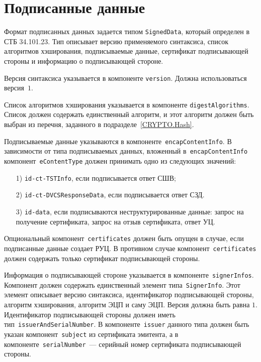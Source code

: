 \section{Подписанные данные}\label{FMT.SignedData}

Формат подписанных данных задается типом \texttt{SignedData}, 
который определен в СТБ 34.101.23. Тип описывает версию применяемого 
синтаксиса, список алгоритмов хэширования, подписываемые данные, 
сертификат подписывающей стороны и информацию о подписывающей стороне. 

Версия синтаксиса указывается в компоненте \texttt{version}.
Должна использоваться версия~$1$.

Список алгоритмов хэширования указывается в компоненте
\texttt{digestAlgorithms}. Список должен содержать единственный алгоритм,
и этот алгоритм должен быть выбран из перечня, 
заданного в подразделе~\ref{CRYPTO.Hash}.

Подписываемые данные указываются в компоненте~\texttt{encapContentInfo}. 
%
В зависимости от типа подписываемых данных, вложенный 
в~\texttt{encapContentInfo} компонент~\texttt{eContentType} 
должен принимать одно из следующих значений:
\begin{enumerate}
\item[1)]
\texttt{id-ct-TSTInfo}, если подписывается ответ СШВ;
\item[2)]
\texttt{id-ct-DVCSResponseData}, если подписывается ответ СЗД. 
\item[3)]
\texttt{id-data}, если подписываются неструктурированные данные:
запрос на получение сертификата, запрос на отзыв сертификата,
ответ УЦ.
\end{enumerate}



Опциональный компонент~\texttt{certificates} должен быть опущен в случае, 
если подписанные данные создает РУЦ. В противном случае 
компонент~\texttt{certificates} должен содержать только сертификат 
подписывающей стороны.

Информация о подписывающей стороне указывается в
компоненте~\texttt{signerInfos}. Компонент должен содержать единственный
элемент типа~\texttt{SignerInfo}. Этот элемент описывает версию синтаксиса,
идентификатор подписывающей стороны, алгоритм хэширования, алгоритм ЭЦП и
саму ЭЦП. Версия должна быть равна $1$. Идентификатор подписывающей стороны
должен иметь тип~\texttt{issuerAndSerialNumber}. В 
компоненте~\texttt{issuer} данного типа должен быть указан 
компонент~\texttt{subject} из сертификата эмитента, а в  
компоненте~\texttt{serialNumber}~--- серийный номер сертификата 
подписывающей стороны. 

